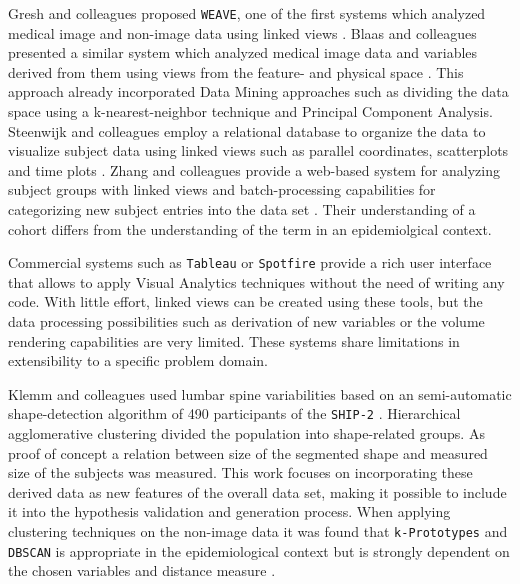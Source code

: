 \documentclass[journal]{style/vgtc} 			          %
\begin{document}
Gresh and colleagues proposed \texttt{WEAVE}, one of the first systems which analyzed medical image and non-image data using linked views \cite{Gresh2000}.
%
Blaas and colleagues presented a similar system which analyzed medical image data and variables derived from them using views from the feature- and physical space \cite{Blaas2007}.
%
This approach already incorporated Data Mining approaches such as dividing the data space using a k-nearest-neighbor technique and Principal Component Analysis.
%
Steenwijk and colleagues employ a relational database to organize the data to visualize subject data using linked views such as parallel coordinates, scatterplots and time plots \cite{Steenwijk2010}.
%
Zhang and colleagues provide a web-based system for analyzing subject groups with linked views and batch-processing capabilities for categorizing new subject entries into the data set \cite{Zhang2012}.
%
Their understanding of a cohort differs from the understanding of the term in an epidemiolgical context.

Commercial systems such as \texttt{Tableau} or \texttt{Spotfire} provide a rich user interface that allows to apply Visual Analytics techniques without the need of writing any code.
%
With little effort, linked views can be created using these tools, but the data processing possibilities such as derivation of new variables or the volume rendering capabilities are very limited.
%
These systems share limitations in extensibility to a specific problem domain.

Klemm and colleagues used lumbar spine variabilities based on an semi-automatic shape-detection algorithm of 490 participants of the \texttt{SHIP-2} \cite{Klemm2013VMV}.
%
Hierarchical agglomerative clustering divided the population into shape-related groups.
%
As proof of concept a relation between size of the segmented shape and measured size of the subjects was measured.
%
This work focuses on incorporating these derived data as new features of the overall data set, making it possible to include it into the hypothesis validation and generation process.
%
When applying clustering techniques on the non-image data it was found that \texttt{k-Prototypes} and \texttt{DBSCAN} is appropriate in the epidemiological context but is strongly dependent on the chosen variables and distance measure \cite{Klemm2014BVM}.
\end{document}
